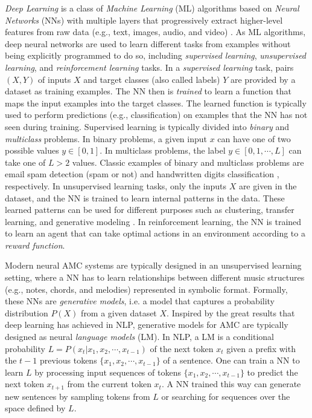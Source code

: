 \textit{Deep Learning} is a class of \textit{Machine Learning} (ML) algorithms based on \textit{Neural Networks} (NNs) with multiple layers that progressively extract higher-level features from raw data (e.g., text, images, audio, and video) \cite{goodfellow2016deep}. As ML algorithms, deep neural networks are used to learn different tasks from examples without being explicitly programmed to do so, including \textit{supervised learning}, \textit{unsupervised learning}, and \textit{reinforcement learning} tasks. In a \textit{supervised learning} task, pairs $(X,Y)$ of inputs $X$ and target classes (also called labels) $Y$ are provided by a dataset as training examples. The NN then is \textit{trained} to learn a function that maps the input examples into the target classes. The learned function is typically used to perform predictions (e.g., classification) on examples that the NN has not seen during training. Supervised learning is typically divided into \textit{binary} and \textit{multiclass} problems. In binary problems, a given input $x$ can have one of two possible values $y \in [0, 1]$. In multiclass problems, the label $y \in [0, 1, \cdots, L]$ can take one of $L > 2$ values. Classic examples of binary and multiclass problems are email spam detection (spam or not) and handwritten digits classification \cite{lecun1998gradient}, respectively. In unsupervised learning tasks, only the inputs $X$ are given in the dataset, and the NN is trained to learn internal patterns in the data. These learned patterns can be used for different purposes such as clustering, transfer learning, and generative modeling \cite{bengio2012unsupervised}. In reinforcement learning, the NN is trained to learn an agent that can take optimal actions in an environment according to a \textit{reward function}.

Modern neural AMC systems are typically designed in an unsupervised learning setting, where a NN has to learn relationships between different music structures (e.g., notes, chords, and melodies) represented in symbolic format. Formally, these NNs are \textit{generative models}, i.e. a model that captures a probability distribution $P(X)$ from a given dataset $X$. Inspired by the great results that deep learning has achieved in NLP, generative models for AMC are typically designed as neural \textit{language models} (LM). In NLP, a LM is a conditional probability $L = P(x_t|x_1, x_2, \cdots, x_{t-1})$ of the next token $x_t$ given a prefix with the $t-1$ previous tokens $\{x_1, x_2, \cdots, x_{t-1}\}$ of a sentence. One can train a NN to learn $L$ by processing input sequences of tokens $\{x_1, x_2, \cdots, x_{t-1}\}$ to predict the next token $x_{t+1}$ from the current token $x_t$. A NN trained this way can generate new sentences by sampling tokens from $L$ or searching for sequences over the space defined by $L$.

